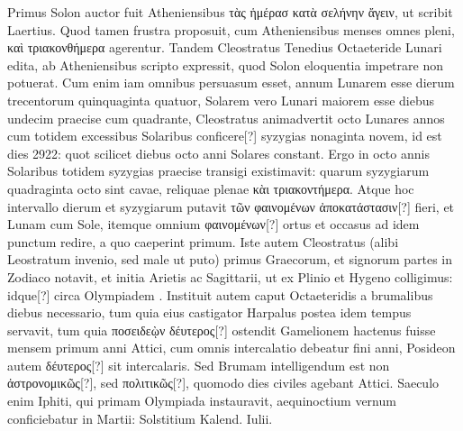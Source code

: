 Primus Solon auctor fuit Atheniensibus
 \textgreek{τὰς ἡμέρασ κατὰ σελήνην ἄγειν},
ut scribit Laertius.
Quod tamen frustra proposuit, cum
Atheniensibus menses omnes pleni, \textgreek{καὶ τριακονθήμερα} agerentur.
Tandem Cleostratus Tenedius Octaeteride Lunari edita, ab Atheniensibus
scripto expressit, quod Solon eloquentia impetrare non potuerat.
Cum enim iam omnibus persuasum esset, annum Lunarem esse dierum
trecentorum quinquaginta quatuor, Solarem vero Lunari maiorem
esse diebus undecim praecise cum quadrante, Cleostratus animadvertit
octo Lunares annos cum totidem excessibus Solaribus conficere[?] syzygias
nonaginta novem, id est dies 2922: quot scilicet diebus octo anni
Solares constant.
Ergo in octo annis Solaribus totidem syzygias praecise
transigi existimavit: quarum syzygiarum quadraginta octo sint
cavae, reliquae plenae \textgreek{κὰι τριακοντήμερα}.
Atque hoc intervallo dierum
et syzygiarum putavit \textgreek{τῶν φαινομένων ἀποκατάστασιν[?]} fieri,
 et Lunam
cum Sole, itemque omnium \textgreek{φαινομένων[?]}
 ortus et occasus ad idem punctum
redire, a quo caeperint primum.
Iste autem Cleostratus (alibi
Leostratum invenio, sed male ut puto) primus Graecorum, et signorum
partes in Zodiaco notavit, et initia Arietis ac Sagittarii, ut ex Plinio
et Hygeno colligimus: idque[?] circa Olympiadem .
Instituit
autem caput Octaeteridis a brumalibus diebus necessario, tum quia
eius castigator Harpalus postea idem tempus servavit, tum quia
 \textgreek{ποσειδεῲν δέυτερος[?]}
ostendit Gamelionem hactenus fuisse mensem primum
anni Attici, cum omnis intercalatio debeatur fini anni, Posideon autem
\textgreek{δέυτερος[?]} sit intercalaris.
Sed Brumam intelligendum est non \textgreek{ἀστρονομικῶς[?]},
sed \textgreek{πολιτικῶς[?]}, quomodo dies civiles agebant Attici.
Saeculo
enim Iphiti, qui primam Olympiada instauravit, aequinoctium vernum
conficiebatur in  Martii: Solstitium Kalend. Iulii.

